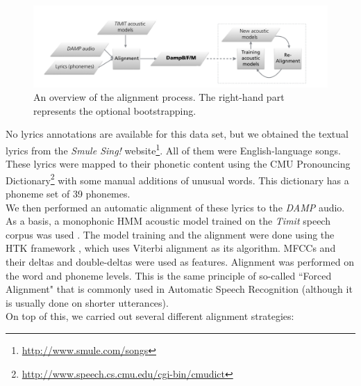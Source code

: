 \begin{figure}
 \begin{center}
                \includegraphics[width=.8\textwidth]{images/overview_bootstrap.png}
                \caption{An overview of the alignment process. The right-hand part represents the optional bootstrapping.}
                \label{fig:process}
                 \end{center}
 \end{figure}
No lyrics annotations are available for this data set, but we obtained the textual lyrics from the \textit{Smule Sing!} website\footnote{\url{http://www.smule.com/songs}}.  All of them were English-language songs. These lyrics were mapped to their phonetic content using the CMU Pronouncing Dictionary\footnote{\url{http://www.speech.cs.cmu.edu/cgi-bin/cmudict}} with some manual additions of unusual words. This dictionary has a phoneme set of 39 phonemes.\\
We then performed an automatic alignment of these lyrics to the \textit{DAMP} audio.\\
As a basis, a monophonic HMM acoustic model trained on the \textit{Timit} speech corpus was used \cite{timit}. The model training and the alignment were done using the HTK framework \cite{htk}, which uses Viterbi alignment as its algorithm. MFCCs and their deltas and double-deltas were used as features. Alignment was performed on the word and phoneme levels. This is the same principle of so-called ``Forced Alignment" that is commonly used in Automatic Speech Recognition \cite{book:jurafsky} (although it is usually done on shorter utterances). \\
On top of this, we carried out several different alignment strategies:
